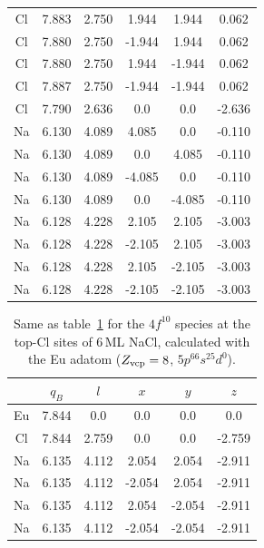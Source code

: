 {\begin{table}[b!]
\begin{ruledtabular}
\begin{tabular}{c  c  c  c  c  c  }
Cl &  7.883 & 2.750 &  1.944 &   1.944 &   0.062 \\
Cl &  7.880 & 2.750 & -1.944 &   1.944 &   0.062 \\
Cl &  7.880 & 2.750 &  1.944 &  -1.944 &   0.062 \\
Cl &  7.887 & 2.750 & -1.944 &  -1.944 &   0.062 \\

Cl & 7.790  & 2.636 &  0.0   &   0.0   &   -2.636 \\

Na & 6.130 & 4.089 &  4.085 &  0.0   & -0.110 \\
Na & 6.130 & 4.089 &  0.0   &  4.085 & -0.110 \\
Na & 6.130 & 4.089 & -4.085 &  0.0   & -0.110 \\
Na & 6.130 & 4.089 &  0.0   & -4.085 & -0.110 \\

Na & 6.128 & 4.228 &  2.105 &   2.105 &   -3.003 \\
Na & 6.128 & 4.228 & -2.105 &   2.105 &   -3.003 \\
Na & 6.128 & 4.228 &  2.105 &  -2.105 &   -3.003 \\
Na & 6.128 & 4.228 & -2.105 &  -2.105 &   -3.003 \\







\end{tabular}
\end{ruledtabular}
\label{tab:bader_Gd_Navac_3MLAg}
\end{table}


\begin{table}[h!]
\caption{Same as table~\ref{tab:bader_Gd_Navac_3MLAg} for the $4f^{10}$ species at the top-Cl sites of 6\,ML NaCl, calculated with the Eu adatom ($Z_{\rm vcp}=8$, $5p^66s^25d^0$).}
\renewcommand{\arraystretch}{1.13}
\begin{ruledtabular}
 \begin{tabular}{c  c  c  c  c  c  }
     &  $q_B$ & $l$ &  $x$  & $y$ &  $z$ \\
\hline

	Eu &  7.844 & 0.0 &  0.0 &   0.0 &   0.0 \\
   Cl  &  7.844 &  2.759 &  0.0 &    0.0 &   -2.759 \\






   Na & 6.135 & 4.112 &  2.054 &   2.054 &  -2.911 \\
   Na & 6.135 & 4.112 & -2.054 &   2.054 &  -2.911 \\
   Na & 6.135 & 4.112 &  2.054 &  -2.054 &  -2.911 \\
   Na & 6.135 & 4.112 & -2.054 &  -2.054 &  -2.911 \\


\end{tabular}
\end{ruledtabular}
\end{table}}
